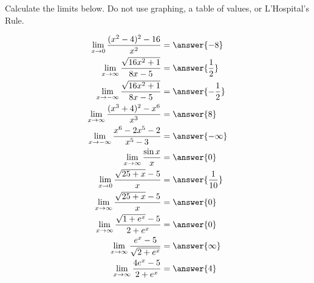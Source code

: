 \documentclass{ximera}
\author{Nela Lakos \and Kyle Parsons}
\begin{document}
\begin{exercise}

Calculate the limits below.  Do not use graphing, a table of values, or L'Hospital's Rule.

\begin{align*}
\lim_{x\to0}\frac{(x^2-4)^2 - 16}{x^2} &= \answer{-8}\\
\lim_{x\to\infty}\frac{\sqrt{16x^2+1}}{8x-5} &= \answer{\frac{1}{2}}\\
\lim_{x\to-\infty}\frac{\sqrt{16x^2+1}}{8x-5} &= \answer{-\frac{1}{2}}\\
\lim_{x\to\infty}\frac{(x^3+4)^2 - x^6}{x^3} &= \answer{8}\\
\lim_{x\to-\infty}\frac{x^6-2x^5-2}{x^5-3} &= \answer{-\infty}\\
\lim_{x\to\infty}\frac{\sin x}{x} &= \answer{0}\\
\lim_{x\to0}\frac{\sqrt{25+x}-5}{x} &= \answer{\frac{1}{10}}\\
\lim_{x\to\infty}\frac{\sqrt{25+x}-5}{x} &= \answer{0}\\
\lim_{x\to\infty}\frac{\sqrt{1+e^x}-5}{2+e^x} &= \answer{0}\\
\lim_{x\to\infty}\frac{e^x-5}{\sqrt{2+e^x}} &= \answer{\infty}\\
\lim_{x\to\infty}\frac{4e^x-5}{2+e^x} &= \answer{4}\\
\end{align*}

\end{exercise}
\end{document}
